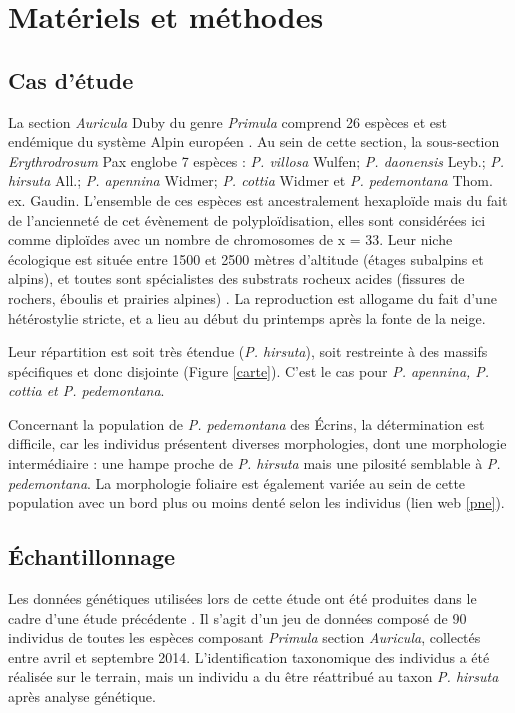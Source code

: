 \documentclass[../Master_report2.tex]{subfiles}
\begin{document}
\section{Matériels et méthodes}

\subsection{Cas d'étude}

La section \textit{Auricula} Duby du genre \textit{Primula} comprend 26 espèces et est endémique du système Alpin européen \citep{Ozenda1995}. Au sein de cette section, la sous-section \textit{Erythrodrosum} Pax englobe 7 espèces : \textit{P. villosa} Wulfen; \textit{P. daonensis} Leyb.; \textit{P. hirsuta} All.; \textit{P. apennina} Widmer; \textit{P. cottia} Widmer et \textit{P. pedemontana} Thom. ex. Gaudin. L'ensemble de ces espèces est ancestralement hexaploïde mais du fait de l'ancienneté de cet évènement de polyploïdisation, elles sont considérées ici comme diploïdes avec un nombre de chromosomes de x = 33. Leur niche écologique est située entre 1500 et 2500 mètres d'altitude (étages subalpins et alpins), et toutes sont spécialistes des substrats rocheux acides (fissures de rochers, éboulis et prairies alpines) \citep{Zhang2004}. La reproduction est allogame du fait d'une hétérostylie stricte, et a lieu au début du printemps après la fonte de la neige.

Leur répartition est soit très étendue (\textit{P. hirsuta}), soit restreinte à des massifs spécifiques et donc disjointe (Figure \ref{carte}). C'est le cas pour \textit{P. apennina, P. cottia et P. pedemontana}.

Concernant la population de \textit{P. pedemontana} des Écrins, la détermination est difficile, car les individus présentent diverses morphologies, dont une morphologie intermédiaire : une hampe proche de \textit{P. hirsuta} mais une pilosité semblable à \textit{P. pedemontana}. La morphologie foliaire est également variée au sein de cette population avec un bord plus ou moins denté selon les individus (lien web \ref{pne}).

\subsection{Échantillonnage}

Les données génétiques utilisées lors de cette étude ont été produites dans le cadre d'une étude précédente \citep{Boucher2016a}. Il s'agit d'un jeu de données composé de 90 individus de toutes les espèces composant \textit{Primula} section \textit{Auricula}, collectés entre avril et septembre 2014. L'identification taxonomique des individus a été réalisée sur le terrain, mais un individu a du être réattribué au taxon \textit{P. hirsuta} après analyse génétique.
\end{document}
